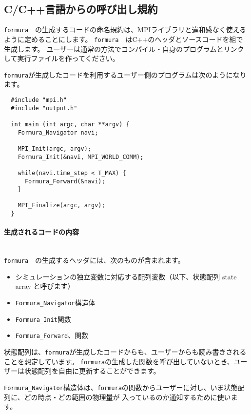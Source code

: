 \documentclass{jsarticle}
\newcommand{\formura}{{\texttt{formura}}}
\begin{document}
\subsection{C/C++言語からの呼び出し規約}

\formura　の生成するコードの命名規約は、MPIライブラリと違和感なく使えるように定めることにします。
\formura　はC++のヘッダとソースコードを組で生成します。
ユーザーは通常の方法でコンパイル・自身のプログラムとリンクして実行ファイルを作ってください。

\formura が生成したコードを利用するユーザー側のプログラムは次のようになります。

\begin{screen}
\begin{verbatim}
  #include "mpi.h"
  #include "output.h"

  int main (int argc, char **argv) {
    Formura_Navigator navi;

    MPI_Init(argc, argv);
    Formura_Init(&navi, MPI_WORLD_COMM);

    while(navi.time_step < T_MAX) {
      Formura_Forward(&navi);
    }

    MPI_Finalize(argc, argv);
  }
\end{verbatim}
\end{screen}

\paragraph{生成されるコードの内容} \leavevmode\\


\formura　の生成するヘッダには、次のものが含まれます。

\begin{itemize}
\item シミュレーションの独立変数に対応する配列変数（以下、状態配列 state array と呼びます）
\item \verb`Formura_Navigator`構造体
\item \verb`Formura_Init`関数
\item \verb`Formura_Forward`、関数
\end{itemize}


状態配列は、\formura が生成したコードからも、ユーザーからも読み書きされることを想定しています。
\formura の生成した関数を呼び出していないとき、ユーザーは状態配列を自由に更新することができます。

\verb`Formura_Navigator`構造体は、\formura の関数からユーザーに対し、いま状態配列に、どの時点・どの範囲の物理量が
入っているのか通知するために使います。
\end{document}
